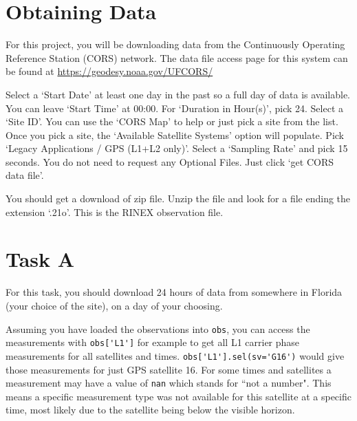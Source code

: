 \documentclass[12pt]{article}
\begin{document}
\section*{\textsf{Obtaining Data}}

For this project, you will be downloading data from the Continuously Operating
Reference Station (CORS) network.  The data file access page for this system can be found at
\url{https://geodesy.noaa.gov/UFCORS/}

Select a `Start Date' at least one day in the past so a full day of data is available.  
You can leave `Start Time' at 00:00.  For `Duration in
Hour(s)', pick 24.  Select a `Site ID'.  You can use the `CORS Map' to help or
just pick a site from the list.  Once you pick a site, the `Available Satellite
Systems' option will populate.  Pick `Legacy Applications / GPS (L1+L2 only)'.
Select a `Sampling Rate' and pick 15 seconds.  You do not need to request any Optional Files.  Just
click `get CORS data file'.

You should get a download of zip file.  Unzip the file and look for a file
ending the extension `.21o'.  This is the RINEX observation file.

\section*{\textsf{Task A}}

For this task, you should download 24 hours of data from somewhere in Florida
(your choice of the site), on a day of your choosing.  

Assuming you have loaded the observations into \lstinline{obs}, you can access the measurements
with \lstinline{obs['L1']} for example to get all L1 carrier phase measurements for all satellites and times.
\lstinline{obs['L1'].sel(sv='G16')} would give those measurements for just GPS satellite 16.  For some 
times and satellites a measurement may have a value of \lstinline{nan} which stands for ``not a number".
This means a specific measurement type was not available for this satellite at a specific time, most
likely due to the satellite being below the visible horizon.


\end{document}
